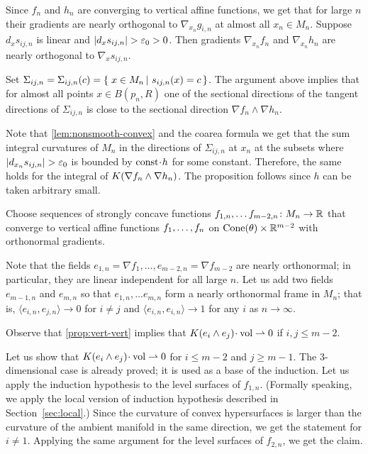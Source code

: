 Since $f_n$ and $h_n$ are converging to vertical affine functions, we get that for large $n$ their gradients are nearly orthogonal to $\nabla_{x_n} g_{i,n}$ at almost all $x_n\in M_n$.
Suppose $d_xs_{ij,n}$ is linear and $|d_xs_{ij,n}|>\eps_0>0$.
Then gradients $\nabla_{x_n}f_n$ and $\nabla_{x_n}h_n$ are nearly orthogonal to $\nabla_x s_{ij,n}$.

Set $\Sigma_{ij,n}=\Sigma_{ij,n}(c)=\set{x\in M_n}{s_{ij,n}(x)=c}$.
The argument above implies that for almost all points $x\in B(p_n,R)$ one of the sectional directions of the tangent directions of $\Sigma_{ij,n}$ is close to the sectional direction $\nabla f_n\wedge\nabla h_n$.

Note that \ref{lem:nonsmooth-convex} and the coarea formula we get that the sum integral curvatures of $M_n$ in the directions of $\Sigma_{ij,n}$ at $x_n$ at the subsets where $|d_{x_n}s_{ij,n}|>\eps_0$ is bounded by $\const\cdot h$ for some constant.
Therefore, the same holds for the integral of $K(\nabla f_n\zz\wedge\nabla h_n)$.
The proposition follows since $h$ can be taken arbitrary small.
\qeds


Choose sequences of strongly concave functions $f_{1,n},\dots f_{m-2,n}\colon M_n\to \mathbb{R}$ that converge to vertical affine functions $f_1,\zz\dots,f_n$ on  $\operatorname{Cone}(\theta)\times \mathbb{R}^{m-2}$ with orthonormal gradients.

Note that the fields $e_{1,n}=\nabla f_1,\dots,e_{m-2,n}=\nabla f_{m-2}$ are nearly orthonormal;
in particular, they are linear independent for all large $n$.
Let us add two fields $e_{m-1,n}$ and $e_{m,n}$  so that $e_{1,n},\dots e_{m,n}$ form a nearly orthonormal frame in $M_n$;
that is, $\langle e_{i,n}, e_{j,n}\rangle\to 0$ for $i\ne j$ and $\langle e_{i,n}, e_{i,n}\rangle\to 1$ for any $i$ as $n\to\infty$.

Observe that \ref{prop:vert-vert} implies that $K(e_i\wedge e_j)\cdot\vol\rightharpoonup 0$ if $i,j\le m-2$.

Let us show that $K(e_i\wedge e_j)\cdot\vol\rightharpoonup 0$ for $i\le m-2$ and $j\ge m-1$.
The $3$-dimensional case is already proved; it is used as a base of the induction.
Let us apply the induction hypothesis to the level surfaces of $f_{1,n}$.
(Formally speaking, we apply the local version of induction hypothesis described in Section~\ref{sec:local}.)
Since the curvature of convex hypersurfaces is larger than the curvature of the ambient manifold in the same direction, we get the statement for $i\ne 1$.
Applying the same argument for the level surfaces of $f_{2,n}$, we get the claim.

